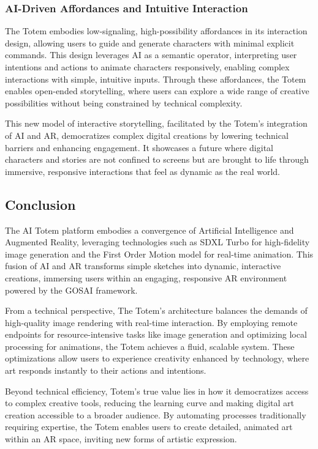 \subsubsection{AI-Driven Affordances and Intuitive Interaction}
The Totem embodies low-signaling, high-possibility affordances in its interaction design, allowing users to guide and generate characters with minimal explicit commands.
This design leverages AI as a semantic operator, interpreting user intentions and actions to animate characters responsively, enabling complex interactions with simple, intuitive inputs.
Through these affordances, the Totem enables open-ended storytelling, where users can explore a wide range of creative possibilities without being constrained by technical complexity.

This new model of interactive storytelling, facilitated by the Totem’s integration of AI and AR, democratizes complex digital creations by lowering technical barriers and enhancing engagement.
It showcases a future where digital characters and stories are not confined to screens but are brought to life through immersive, responsive interactions that feel as dynamic as the real world.

\subsection{Conclusion}
The AI Totem platform embodies a convergence of Artificial Intelligence and Augmented Reality, leveraging technologies such as SDXL Turbo for high-fidelity image generation and the First Order Motion model for real-time animation.
This fusion of AI and AR transforms simple sketches into dynamic, interactive creations, immersing users within an engaging, responsive AR environment powered by the GOSAI framework.

From a technical perspective, The Totem’s architecture balances the demands of high-quality image rendering with real-time interaction.
By employing remote endpoints for resource-intensive tasks like image generation and optimizing local processing for animations, the Totem achieves a fluid, scalable system.
These optimizations allow users to experience creativity enhanced by technology, where art responds instantly to their actions and intentions.

Beyond technical efficiency, Totem’s true value lies in how it democratizes access to complex creative tools, reducing the learning curve and making digital art creation accessible to a broader audience.
By automating processes traditionally requiring expertise, the Totem enables users to create detailed, animated art within an AR space, inviting new forms of artistic expression.

